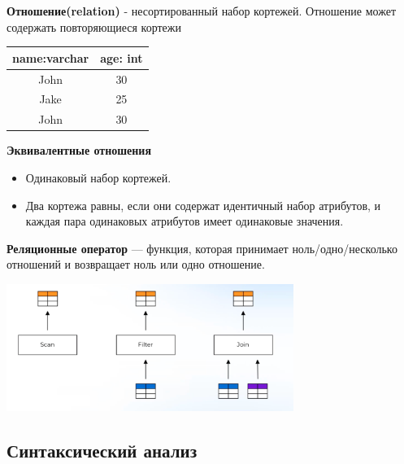 \documentclass[11pt]{article}
\begin{document}
    \textbf{Отношение(relation)} - несортированный набор кортежей.
    Отношение может содержать повторяющиеся кортежи

    \begin{center}
        \begin{tabular}{| c | c |}
            \hline
            \textbf{name:varchar} & \textbf{age: int} \\
            \hline
            John                  & 30                \\
            \hline
            Jake                  & 25                \\
            \hline
            John                  & 30                \\
            \hline
        \end{tabular}
    \end{center}

    \newpage

    \textbf{Эквивалентные отношения}
    \begin{itemize}
        \item Одинаковый набор кортежей.
        \item Два кортежа равны, если они содержат идентичный набор атрибутов, и каждая пара одинаковых атрибутов имеет одинаковые значения.
    \end{itemize}

    \textbf{Реляционные оператор} --- функция, которая принимает ноль/одно/несколько отношений и возвращает ноль или одно отношение.

    \includegraphics*[width=0.7\textwidth]{Pictures/Relational algebra/Relational operator}

    \subsection*{Синтаксический анализ}
\end{document}
